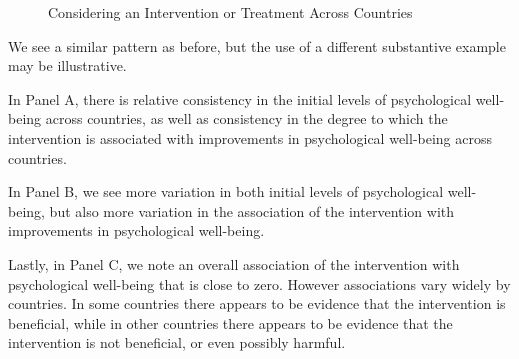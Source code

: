 \documentclass[
  letterpaper,
  DIV=11,
  numbers=noendperiod]{scrreprt}
\begin{document}
\begin{figure}


\caption{\label{fig-variation2}Considering an Intervention or Treatment
Across Countries}

\end{figure}%

We see a similar pattern as before, but the use of a different
substantive example may be illustrative.

In Panel A, there is relative consistency in the initial levels of
psychological well-being across countries, as well as consistency in the
degree to which the intervention is associated with improvements in
psychological well-being across countries.

In Panel B, we see more variation in both initial levels of
psychological well-being, but also more variation in the association of
the intervention with improvements in psychological well-being.

Lastly, in Panel C, we note an overall association of the intervention
with psychological well-being that is close to zero. However
associations vary widely by countries. In some countries there appears
to be evidence that the intervention is beneficial, while in other
countries there appears to be evidence that the intervention is not
beneficial, or even possibly harmful.
\end{document}
